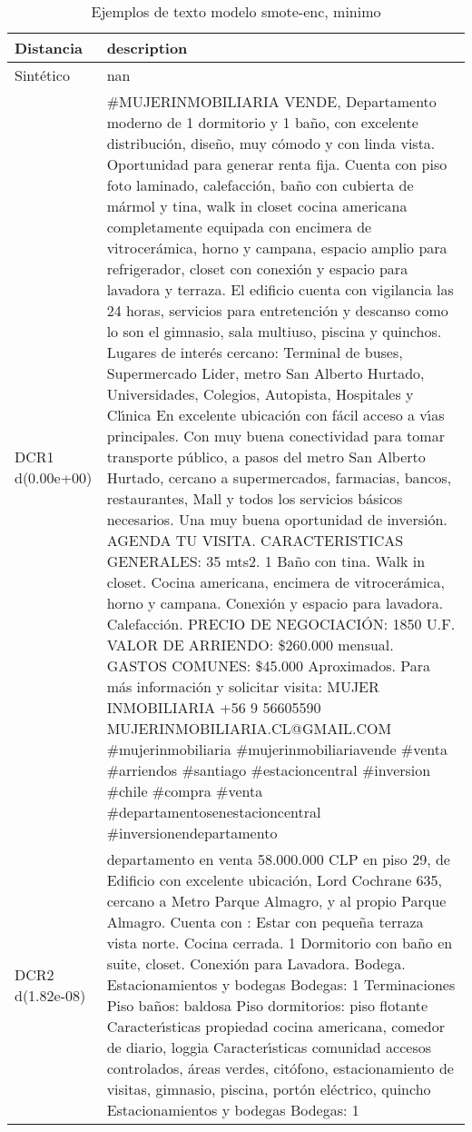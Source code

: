 \begin{table}[H]
\centering
\fontsize{10}{14}\selectfont
\caption{Ejemplos de texto modelo smote-enc, minimo}
\label{table-example-economicos-a-3-smote-enc-min-text}
\begin{tabular}{|l|m{35em}|}
\hline
\rowcolor[gray]{0.8}
Distancia & description \\
\hline Sintético & nan \\
\hline DCR1 d(0.00e+00) & \#MUJERINMOBILIARIA VENDE, Departamento moderno de 1 dormitorio y 1 ba\~no, con excelente distribuci\'on, dise\~no, muy c\'omodo y con linda vista. Oportunidad para generar renta fija.  Cuenta con piso foto laminado, calefacci\'on, ba\~no con cubierta de m\'armol y tina, walk in closet cocina americana completamente equipada con encimera de vitrocer\'amica, horno y campana, espacio amplio para refrigerador, closet con conexi\'on y espacio para lavadora y terraza.  El edificio cuenta con vigilancia las 24 horas, servicios para entretenci\'on y descanso como lo son el gimnasio, sala multiuso, piscina y quinchos.  Lugares de inter\'es cercano: Terminal de buses, Supermercado Lider, metro San Alberto Hurtado, Universidades, Colegios, Autopista, Hospitales y Cl{\'\i}nica  En excelente ubicaci\'on con f\'acil acceso a v{\'\i}as principales. Con muy buena conectividad para tomar transporte p\'ublico, a pasos del metro San Alberto Hurtado, cercano a supermercados, farmacias, bancos, restaurantes, Mall y todos los servicios b\'asicos necesarios.  Una muy buena oportunidad de inversi\'on. AGENDA TU VISITA.  CARACTERISTICAS GENERALES: 35 mts2. 1 Ba\~no con tina. Walk in closet. Cocina americana, encimera de vitrocer\'amica, horno y campana. Conexi\'on y espacio para lavadora. Calefacci\'on.  PRECIO DE NEGOCIACI\'ON: 1850 U.F. VALOR DE ARRIENDO: \$260.000 mensual. GASTOS COMUNES: \$45.000 Aproximados.  Para m\'as informaci\'on y solicitar visita: MUJER INMOBILIARIA +56 9 56605590  MUJERINMOBILIARIA.CL@GMAIL.COM  \#mujerinmobiliaria \#mujerinmobiliariavende \#venta \#arriendos \#santiago \#estacioncentral \#inversion \#chile \#compra \#venta \#departamentosenestacioncentral \#inversionendepartamento \\
\hline DCR2 d(1.82e-08) & departamento en venta 58.000.000 CLP en piso 29, de Edificio con excelente ubicaci\'on, Lord Cochrane 635, cercano a Metro Parque Almagro, y al propio Parque Almagro. Cuenta con : Estar con peque\~na terraza vista norte. Cocina cerrada. 1 Dormitorio con ba\~no en suite, closet. Conexi\'on para Lavadora. Bodega.  Estacionamientos y bodegas Bodegas: 1    Terminaciones  Piso ba\~nos: baldosa Piso dormitorios: piso flotante  Caracter{\'\i}sticas propiedad  cocina americana, comedor de diario, loggia  Caracter{\'\i}sticas comunidad  accesos controlados, \'areas verdes, cit\'ofono, estacionamiento de visitas, gimnasio, piscina, port\'on el\'ectrico, quincho  Estacionamientos y bodegas   Bodegas: 1 \\
\hline
\end{tabular}
\end{table}
